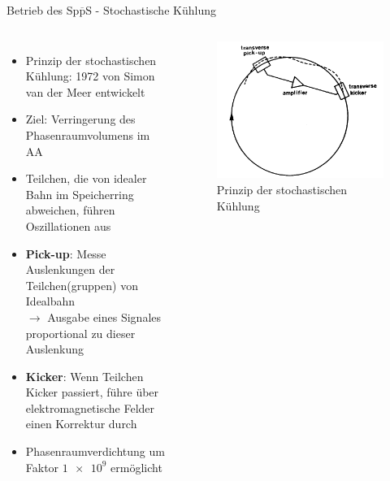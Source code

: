 \documentclass[aspectratio=1610, professionalfonts, 10pt]{beamer}
\begin{document}
\begin{frame}{Betrieb des Sp$\overline{\text{p}}$S - Stochastische Kühlung}
	\begin{columns}
				\begin{itemize}
					\setlength\itemsep{0.5em}
					\item Prinzip der stochastischen Kühlung: 1972 von Simon van der Meer entwickelt
					\item Ziel: Verringerung des Phasenraumvolumens im AA
					\item Teilchen, die von idealer Bahn im Speicherring abweichen, führen Oszillationen aus
					\item \textbf{Pick-up}: Messe Auslenkungen der Teilchen(gruppen) von Idealbahn\\
					$\rightarrow$ Ausgabe eines Signales proportional zu dieser Auslenkung
					\item \textbf{Kicker}: Wenn Teilchen Kicker passiert, führe über elektromagnetische Felder einen Korrektur durch
					\item Phasenraumverdichtung um Faktor $\num{1e9}$ ermöglicht
				\end{itemize}
			\begin{figure}
	  			\centering
				\includegraphics[width=\linewidth]{Images/Screenshot_2018-12-04_12-28-18.png}
				\caption{Prinzip der stochastischen Kühlung \cite{doi:10.1142/9789814644150_0006}}
	  			\label{fig:sad}
			\end{figure}
	\end{columns}
\end{frame}
\end{document}
